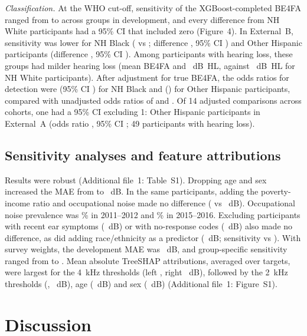 \documentclass[11pt]{article}
\begin{document}
\emph{Classification.} At the WHO cut-off, sensitivity of the XGBoost-completed BE4FA ranged from \SensGrpMinDev{} to \SensGrpMaxDev{} across groups in development, and every difference from NH White participants had a 95\% CI that included zero (Figure~4). In External~B, sensitivity was lower for NH Black (\SensXgbBlackExtB{} vs \SensXgbWhiteExtB{}; difference \SensDiffBlackExtB{}, 95\% CI \SensDiffCiBlackExtB{}) and Other Hispanic participants (difference \SensDiffOthHispExtB{}, 95\% CI \SensDiffCiOthHispExtB{}). Among participants with hearing loss, these groups had milder hearing loss (mean BE4FA \PosFourFaBlackExtB{} and \PosFourFaOthHispExtB{}~dB~HL, against \PosFourFaWhiteExtB{}~dB~HL for NH White participants). After adjustment for true BE4FA, the odds ratios for detection were \OrCondBlackExtB{} (95\% CI \OrCiCondBlackExtB{}) for NH Black and \OrCondOthHispExtB{} (\OrCiCondOthHispExtB{}) for Other Hispanic participants, compared with unadjusted odds ratios of \OrRawBlackExtB{} and \OrRawOthHispExtB{}. Of 14 adjusted comparisons across cohorts, one had a 95\% CI excluding 1: Other Hispanic participants in External~A (odds ratio \OrCondOthHispExtA{}, 95\% CI \OrCiCondOthHispExtA{}; 49 participants with hearing loss).

\subsection*{Sensitivity analyses and feature attributions}
Results were robust (Additional file~1: Table~S1). Dropping age and sex increased the MAE from \SaPrimaryMae{} to \SaThrOnlyMae{}~dB. In the same participants, adding the poverty-income ratio and occupational noise made no difference (\SaPirNoiseMae{} vs \SaSameCcMae{}~dB). Occupational noise prevalence was \NoiseDevA{}\% in 2011--2012 and \NoiseDevB{}\% in 2015--2016. Excluding participants with recent ear symptoms (\SaExclIllMae{}~dB) or with no-response codes (\SaExclNrMae{}~dB) also made no difference, as did adding race/ethnicity as a predictor (\SaRaceMae{}~dB; sensitivity \SaRaceSens{} vs \SaPrimarySens{}). With survey weights, the development MAE was \MaeXgbDevW{}~dB, and group-specific sensitivity ranged from \WSensMin{} to \WSensMax{}. Mean absolute TreeSHAP attributions, averaged over targets, were largest for the 4~kHz thresholds (left \ShapLFour{}, right \ShapRFour{}~dB), followed by the 2~kHz thresholds (\ShapLTwo{}, \ShapRTwo{}~dB), age (\ShapAge{}~dB) and sex (\ShapSex{}~dB) (Additional file~1: Figure~S1).

\section*{Discussion}
\end{document}
